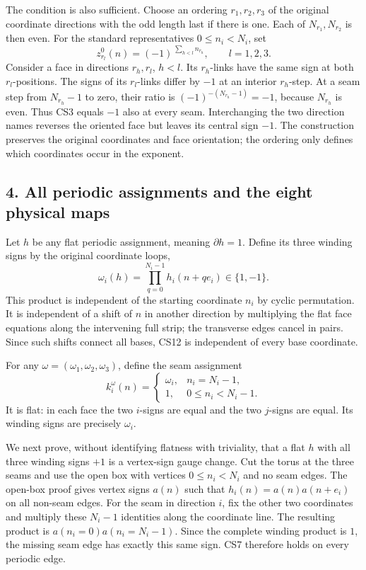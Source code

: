 \documentclass[11pt]{article}
\begin{document}
The condition is also sufficient. Choose an ordering \(r_1,r_2,r_3\) of the original coordinate directions with the odd length last if there is one. Each of \(N_{r_1},N_{r_2}\) is then even. For the standard representatives \(0\le n_i<N_i\), set
\[
 z_{r_l}^0(n)=(-1)^{\,\sum_{h<l}n_{r_h}},
       \qquad l=1,2,3.
 \tag{CS11}
\]
Consider a face in directions \(r_h,r_l\), \(h<l\). Its \(r_h\)-links have the same sign at both \(r_l\)-positions. The signs of its \(r_l\)-links differ by \(-1\) at an interior \(r_h\)-step. At a seam step from \(N_{r_h}-1\) to zero, their ratio is \((-1)^{-(N_{r_h}-1)}=-1\), because \(N_{r_h}\) is even. Thus CS3 equals \(-1\) also at every seam. Interchanging the two direction names reverses the oriented face but leaves its central sign \(-1\). The construction preserves the original coordinates and face orientation; the ordering only defines which coordinates occur in the exponent.

\subsection*{4. All periodic assignments and the eight physical maps}

Let \(h\) be any flat periodic assignment, meaning \(\partial h=1\). Define its three winding signs by the original coordinate loops,
\[
 \omega_i(h)=\prod_{q=0}^{N_i-1}h_i(n+qe_i)\in\{1,-1\}.
 \tag{CS12}
\]
This product is independent of the starting coordinate \(n_i\) by cyclic permutation. It is independent of a shift of \(n\) in another direction by multiplying the flat face equations along the intervening full strip; the transverse edges cancel in pairs. Since such shifts connect all bases, CS12 is independent of every base coordinate.

For any \(\omega=(\omega_1,\omega_2,\omega_3)\), define the seam assignment
\[
 k_i^\omega(n)=
 \begin{cases}
 \omega_i,&n_i=N_i-1,\\
 1,&0\le n_i<N_i-1.
 \end{cases}
 \tag{CS13}
\]
It is flat: in each face the two \(i\)-signs are equal and the two \(j\)-signs are equal. Its winding signs are precisely \(\omega_i\).

We next prove, without identifying flatness with triviality, that a flat \(h\) with all three winding signs \(+1\) is a vertex-sign gauge change. Cut the torus at the three seams and use the open box with vertices \(0\le n_i<N_i\) and no seam edges. The open-box proof gives vertex signs \(a(n)\) such that \(h_i(n)=a(n)a(n+e_i)\) on all non-seam edges. For the seam in direction \(i\), fix the other two coordinates and multiply these \(N_i-1\) identities along the coordinate line. The resulting product is \(a(n_i=0)a(n_i=N_i-1)\). Since the complete winding product is \(1\), the missing seam edge has exactly this same sign. CS7 therefore holds on every periodic edge.
\end{document}
